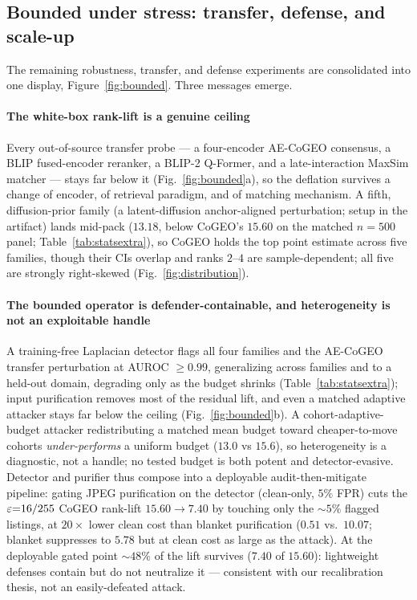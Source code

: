 \subsection{Bounded under stress: transfer, defense, and scale-up}
\label{sec:analysis:summary}

The remaining robustness, transfer, and defense experiments are consolidated into one display, Figure~\ref{fig:bounded}. Three messages emerge.

\paragraph{The white-box rank-lift is a genuine ceiling} Every out-of-source transfer probe --- a four-encoder AE-CoGEO consensus, a BLIP fused-encoder reranker, a BLIP-2 Q-Former, and a late-interaction MaxSim matcher --- stays far below it (Fig.~\ref{fig:bounded}a), so the deflation survives a change of encoder, of retrieval paradigm, and of matching mechanism. A fifth, diffusion-prior family (a latent-diffusion anchor-aligned perturbation; setup in the artifact) lands mid-pack ($13.18$, below CoGEO's $15.60$ on the matched $n{=}500$ panel; Table~\ref{tab:statsextra}), so CoGEO holds the top point estimate across five families, though their CIs overlap and ranks $2$--$4$ are sample-dependent; all five are strongly right-skewed (Fig.~\ref{fig:distribution}).

\paragraph{The bounded operator is defender-containable, and heterogeneity is not an exploitable handle} A training-free Laplacian detector flags all four families and the AE-CoGEO transfer perturbation at AUROC $\geq0.99$, generalizing across families and to a held-out domain, degrading only as the budget shrinks (Table~\ref{tab:statsextra}); input purification removes most of the residual lift, and even a matched adaptive attacker stays far below the ceiling (Fig.~\ref{fig:bounded}b). A cohort-adaptive-budget attacker redistributing a matched mean budget toward cheaper-to-move cohorts \emph{under-performs} a uniform budget ($13.0$ vs $15.6$), so heterogeneity is a diagnostic, not a handle; no tested budget is both potent and detector-evasive. Detector and purifier thus compose into a deployable audit-then-mitigate pipeline: gating JPEG purification on the detector (clean-only, $5\%$ FPR) cuts the $\varepsilon{=}16/255$ CoGEO rank-lift $15.60\to7.40$ by touching only the $\sim\!5\%$ flagged listings, at $20\times$ lower clean cost than blanket purification ($0.51$ vs.\ $10.07$; blanket suppresses to $5.78$ but at clean cost as large as the attack). At the deployable gated point $\sim\!48\%$ of the lift survives ($7.40$ of $15.60$): lightweight defenses contain but do not neutralize it --- consistent with our recalibration thesis, not an easily-defeated attack.

